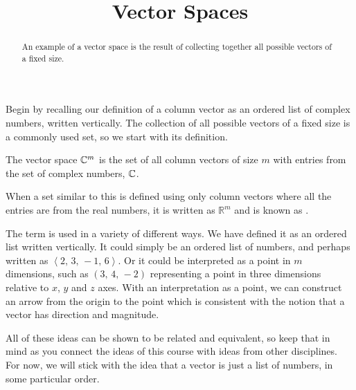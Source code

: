 \documentclass{ximera}
\title{Vector Spaces}
\begin{document}
\begin{abstract}
  An example of a vector space is the result of collecting together
  all possible vectors of a fixed size.
\end{abstract}
\maketitle

Begin by recalling our definition of a column vector as an ordered
list of complex numbers, written vertically.  The collection of all
possible vectors of a fixed size is a commonly used set, so we start
with its definition.

\begin{definition}
The vector space $\mathbb{C}^{m}$ is the set of all column vectors of size $m$ with entries from the set of complex numbers, $\mathbb{C}$.

When a set similar to this is defined using only column vectors where
all the entries are from the real numbers, it is written as
${\mathbb R}^m$ and is known as .
\end{definition}

The term  is used in a variety of different ways.  We have
defined it as an ordered list written vertically.  It could simply be
an ordered list of numbers, and perhaps written as
$\left\langle 2,\,3,\,-1,\,6\right\rangle$.  Or it could be
interpreted as a point in $m$ dimensions, such as
$\left(3,\,4,\,-2\right)$ representing a point in three dimensions
relative to $x$, $y$ and $z$ axes.  With an interpretation as a point,
we can construct an arrow from the origin to the point which is
consistent with the notion that a vector has direction and magnitude.

All of these ideas can be shown to be related and equivalent, so keep
that in mind as you connect the ideas of this course with ideas from
other disciplines.  For now, we will stick with the idea that a vector
is just a list of numbers, in some particular order.
\end{document}
